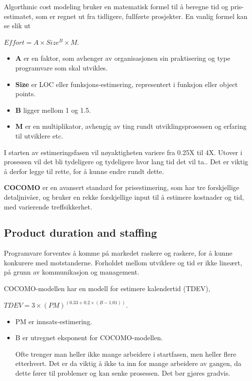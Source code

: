 \documentclass[11pt]{article}
\begin{document}
   Algorthmic cost modeling bruker en matematisk formel til å beregne tid og pris-estimatet, 
   som er regnet ut fra tidligere, fullførte prosjekter. En vanlig formel kan se slik ut 
   
   $Effort = A \times Size^B \times M$. 

\begin{itemize}
\item \textbf{A} er en faktor, som avhenger av organisasjonen sin praktisering og type programvare som skal utvikles.
\item \textbf{Size} er LOC eller funksjons-estimering, representert i funksjon eller object points.
\item \textbf{B} ligger mellom 1 og 1.5.
\item \textbf{M} er en multiplikator, avhengig av ting rundt utviklingsprosessen og erfaring til utviklere etc.
\end{itemize}

   I starten av estimeringsfasen vil nøyaktigheten variere fra 0.25X til 4X. Utover i prosessen 
   vil det bli tydeligere og tydeligere hvor lang tid det vil ta.. Det er viktig å derfor legge til rette, for å kunne endre rundt dette.

   \textbf{COCOMO} er en avansert standard for prisestimering, som har tre forskjellige detaljnivåer,
   og bruker en rekke forskjellige input til å estimere kostnader og tid, med varierende treffsikkerhet. 
\subsection{Product duration and staffing}
\label{sec-10.4}

   Programvare forventes å komme på markedet raskere og raskere, for å kunne konkurere med motstanderne. 
   Forholdet mellom utviklere og tid er ikke lineært, på grunn av kommunikasjon og management.

   COCOMO-modellen har en modell for estimere kalendertid (TDEV), 
   
   $TDEV = 3 \times (PM)^{(0.33+0.2 \times (B-1.01))}$.
   
\begin{itemize}
\item PM er innsats-estimering.
\item B er utregnet eksponent for COCOMO-modellen.

     Ofte trenger man heller ikke mange arbeidere i startfasen, men heller flere etterhvert. 
     Det er da viktig å ikke ta inn for mange arbeidere av gangen, da dette fører til problemer
     og kan senke prosessen. Det bør gjøres gradvis.
\end{itemize}
\end{document}

